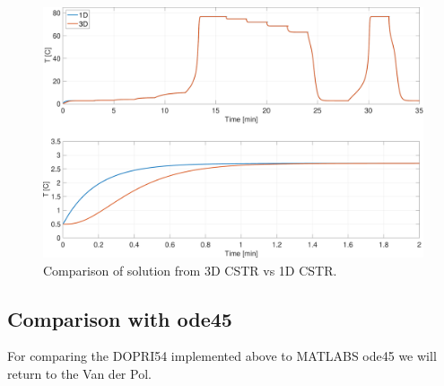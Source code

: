 \begin{figure}[h]
    \centering
    \includegraphics[width=\textwidth]{plots/6_5_both.pdf}
    \caption{Comparison of solution from 3D CSTR vs 1D CSTR.}
    \label{fig:6_5_both}
\end{figure}


\subsection{Comparison with ode45}
For comparing the DOPRI54 implemented above to MATLABS ode45 we will return to the Van der Pol.





























